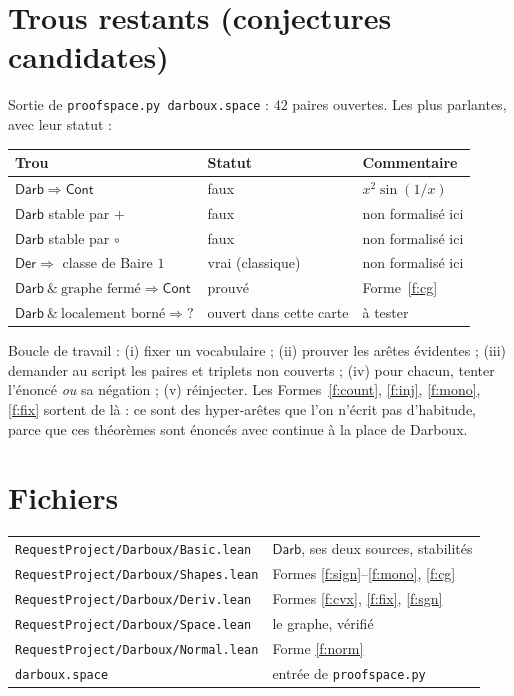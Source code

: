 \documentclass[11pt,a4paper]{article}
\theoremstyle{plain}
\theoremstyle{definition}
\theoremstyle{remark}
\newcommand{\Darb}{\mathsf{Darb}}
\newcommand{\Cont}{\mathsf{Cont}}
\newcommand{\Der}{\mathsf{Der}}
\begin{document}
\section{Trous restants (conjectures candidates)}

Sortie de \texttt{proofspace.py darboux.space} : $42$ paires ouvertes. Les plus parlantes,
avec leur statut :

\begin{center}
\begin{tabular}{@{}lll@{}}
\toprule
Trou & Statut & Commentaire\\
\midrule
$\Darb \Rightarrow \Cont$ & faux & $x^2\sin(1/x)$\\
$\Darb$ stable par $+$ & faux & non formalisé ici\\
$\Darb$ stable par $\circ$ & faux & non formalisé ici\\
$\Der \Rightarrow$ classe de Baire $1$ & vrai (classique) & non formalisé ici\\
$\Darb\ \&\ \text{graphe fermé} \Rightarrow \Cont$ & prouvé & Forme~\ref{f:cg}\\
$\Darb\ \&\ \text{localement borné} \Rightarrow{}?$ & ouvert dans cette carte & à tester\\
\bottomrule
\end{tabular}
\end{center}

\noindent Boucle de travail : (i) fixer un vocabulaire ; (ii) prouver les arêtes évidentes ;
(iii) demander au script les paires et triplets non couverts ; (iv) pour chacun, tenter
l'énoncé \emph{ou} sa négation ; (v) réinjecter. Les Formes~\ref{f:count}, \ref{f:inj},
\ref{f:mono}, \ref{f:fix} sortent de là : ce sont des hyper-arêtes que l'on n'écrit pas
d'habitude, parce que ces théorèmes sont énoncés avec \og{}continue\fg{} à la place de
\og{}Darboux\fg{}.

\section*{Fichiers}

\begin{center}
\begin{tabular}{@{}ll@{}}
\toprule
\texttt{RequestProject/Darboux/Basic.lean} & $\Darb$, ses deux sources, stabilités\\
\texttt{RequestProject/Darboux/Shapes.lean} & Formes \ref{f:sign}--\ref{f:mono}, \ref{f:cg}\\
\texttt{RequestProject/Darboux/Deriv.lean} & Formes \ref{f:cvx}, \ref{f:fix}, \ref{f:sgn}\\
\texttt{RequestProject/Darboux/Space.lean} & le graphe, vérifié\\
\texttt{RequestProject/Darboux/Normal.lean} & Forme \ref{f:norm}\\
\texttt{darboux.space} & entrée de \texttt{proofspace.py}\\
\bottomrule
\end{tabular}
\end{center}
\end{document}
